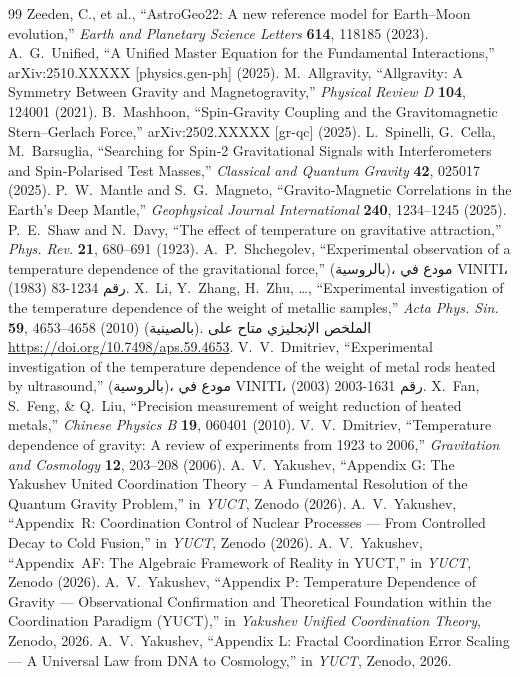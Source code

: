 \documentclass[11pt,a4paper]{article}
\begin{document}
\begin{thebibliography}{99}
		 Zeeden, C., et al., ``AstroGeo22: A new reference model for Earth–Moon evolution,'' \emph{Earth and Planetary Science Letters} \textbf{614}, 118185 (2023).
		A.~G.~Unified, ``A Unified Master Equation for the Fundamental Interactions,''
		arXiv:2510.XXXXX [physics.gen-ph] (2025).
		M.~Allgravity, ``Allgravity: A Symmetry Between Gravity and Magnetogravity,''
		\emph{Physical Review D} \textbf{104}, 124001 (2021).
		B.~Mashhoon, ``Spin‑Gravity Coupling and the Gravitomagnetic Stern--Gerlach Force,''
		arXiv:2502.XXXXX [gr-qc] (2025).
		L.~Spinelli, G.~Cella, M.~Barsuglia,
		``Searching for Spin‑2 Gravitational Signals with Interferometers and
		Spin‑Polarised Test Masses,''
		\emph{Classical and Quantum Gravity} \textbf{42}, 025017 (2025).
		P.~W.~Mantle and S.~G.~Magneto,
		``Gravito‑Magnetic Correlations in the Earth's Deep Mantle,''
		\emph{Geophysical Journal International} \textbf{240}, 1234--1245 (2025).
		P.~E.~Shaw and N.~Davy, ``The effect of temperature on gravitative attraction,'' \emph{Phys. Rev.} \textbf{21}, 680–691 (1923).
		A.~P.~Shchegolev, ``Experimental observation of a temperature dependence of the gravitational force,'' (بالروسية)، مودع في VINITI، رقم 1234-83 (1983).
		X.~Li, Y.~Zhang, H.~Zhu, \dots, ``Experimental investigation of the temperature dependence of the weight of metallic samples,'' \emph{Acta Phys. Sin.} \textbf{59}, 4653–4658 (2010) (بالصينية). الملخص الإنجليزي متاح على \url{https://doi.org/10.7498/aps.59.4653}.
		V.~V.~Dmitriev, ``Experimental investigation of the temperature dependence of the weight of metal rods heated by ultrasound,'' (بالروسية)، مودع في VINITI، رقم 1631-2003 (2003).
		X.~Fan, S.~Feng, \& Q.~Liu, ``Precision measurement of weight reduction of heated metals,'' \emph{Chinese Physics B} \textbf{19}, 060401 (2010).
		V.~V.~Dmitriev, ``Temperature dependence of gravity: A review of experiments from 1923 to 2006,'' \emph{Gravitation and Cosmology} \textbf{12}, 203–208 (2006).
		A.~V.~Yakushev, ``Appendix G: The Yakushev United Coordination Theory -- A
		Fundamental Resolution of the Quantum Gravity Problem,''
		in \emph{YUCT}, Zenodo (2026).
		A.~V.~Yakushev, ``Appendix~R: Coordination Control of Nuclear Processes ---
		From Controlled Decay to Cold Fusion,''
		in \emph{YUCT}, Zenodo (2026).
		A.~V.~Yakushev, ``Appendix~AF: The Algebraic Framework of Reality in YUCT,''
		in \emph{YUCT}, Zenodo (2026).
		A.~V.~Yakushev, ``Appendix P: Temperature Dependence of Gravity — Observational Confirmation and Theoretical Foundation within the Coordination Paradigm (YUCT),'' in \emph{Yakushev Unified Coordination Theory}, Zenodo, 2026.
		A.~V.~Yakushev, ``Appendix L: Fractal Coordination Error Scaling — A Universal Law from DNA to Cosmology,'' in \emph{YUCT}, Zenodo, 2026.
	\end{thebibliography}
	
\end{document}
